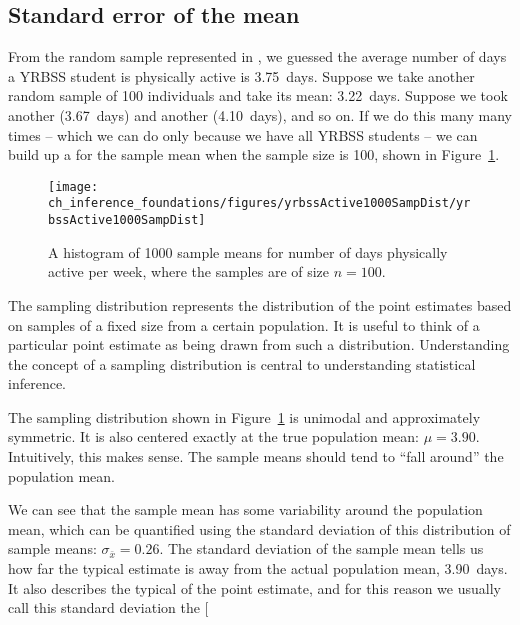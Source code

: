 \subsection{Standard error of the mean}
\label{seOfTheMean}

From the random sample represented in , we guessed the average number of days a YRBSS student is physically active is 3.75~days. Suppose we take another random sample of 100 individuals and take its mean: 3.22~days. Suppose we took another (3.67~days) and another (4.10~days), and so on. If we do this many many times -- which we can do only because we have all YRBSS students -- we can build up a  for the sample mean when the sample size is 100, shown in Figure~\ref{yrbssActive1000SampDist}.

\begin{figure}[h]
   \centering
   \texttt{[image: ch\_inference\_foundations/figures/yrbssActive1000SampDist/yrbssActive1000SampDist]}
   \caption{A histogram of 1000 sample means for number of days physically active per week, where the samples are of size $n=100$.}
   \label{yrbssActive1000SampDist}
\end{figure}

\begin{termBox}{
The sampling distribution represents the distribution of the point estimates based on samples of a fixed size from a certain population. It is useful to think of a particular point estimate as being drawn from such a distribution. Understanding the concept of a sampling distribution is central to understanding statistical inference.}
\end{termBox}

The sampling distribution shown in Figure~\ref{yrbssActive1000SampDist} is unimodal and approximately symmetric. It is also centered exactly at the true population mean: $\mu=3.90$. Intuitively, this makes sense. The sample means should tend to ``fall around'' the population mean.

We can see that the sample mean has some variability around the population mean, which can be quantified using the standard deviation of this distribution of sample means: $\sigma_{\bar{x}} = 0.26$. The standard deviation of the sample mean tells us how far the typical estimate is away from the actual population mean, 3.90~days. It also describes the typical  of the point estimate, and for this reason we usually call this standard deviation the \marginpar[\raggedright\vspace{-4mm}

